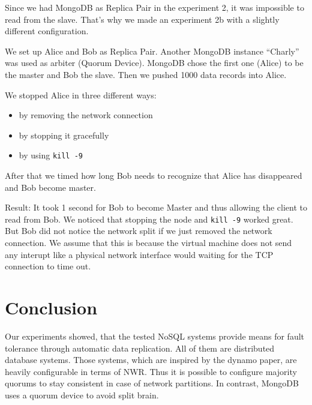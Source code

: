 Since we had MongoDB as Replica Pair in the experiment 2, it was
impossible to read from the slave. That's why we made an experiment
2b with a slightly different configuration.

We set up Alice and Bob as Replica Pair. Another MongoDB instance
``Charly'' was used as arbiter (Quorum Device). MongoDB chose the
first one (Alice) to be the master and Bob the slave. Then we
pushed 1000 data records into Alice.

We stopped Alice in three different ways:

\begin{itemize}
\item
  by removing the network connection
\item
  by stopping it gracefully
\item
  by using \texttt{kill -9}
\end{itemize}
After that we timed how long Bob needs to recognize that Alice has
disappeared and Bob become master.

Result: It took 1 second for Bob to become Master and thus allowing
the client to read from Bob. We noticed that stopping the node and \texttt{kill -9} worked great. But
Bob did not notice the network split if we just removed the network
connection. We assume that this is because the virtual machine does
not send any interupt like a physical network interface would
waiting for the TCP connection to time out.


\section{Conclusion} %
\label{sec:conclusion}

Our experiments showed, that the tested NoSQL systems provide means for fault tolerance through automatic data replication.
All of them are distributed database systems.
Those systems, which are inspired by the dynamo paper, are heavily configurable in terms of NWR.
Thus it is possible to configure majority quorums to stay consistent in case of network partitions.
In contrast, MongoDB uses a quorum device to avoid split brain.




